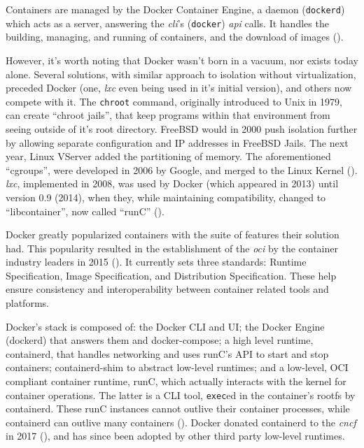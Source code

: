 \documentclass[11pt]{article}
\begin{document}
\begin{flushleft}
    Containers are managed by the Docker Container Engine, a daemon (\texttt{dockerd}) which acts as a server, answering the \textit{\acrshort{cli}}'s (\texttt{docker}) \textit{\acrshort{api}} calls. It handles the building, managing, and running of containers, and the download of images (\cite{dockerengine}).
    \linebreak

    However, it's worth noting that Docker wasn't born in a vacuum, nor exists today alone. Several solutions, with similar approach to isolation without virtualization, preceded Docker (one, \textit{\acrshort{lxc}} even being used in it's initial version), and others now compete with it. The \texttt{chroot} command, originally introduced to Unix in 1979, can create ``chroot jails'', that keep programs within that environment from seeing outside of it's root directory. FreeBSD would in 2000 push isolation further by allowing separate configuration and IP addresses in FreeBSD Jails. The next year, Linux VServer added the partitioning of memory. The aforementioned ``cgroups'', were developed in 2006 by Google, and merged to the Linux Kernel (\cite{historycontainers}). \textit{\acrlong{lxc}}, implemented in 2008, was used by Docker (which appeared in 2013) until version 0.9 (2014), when they, while maintaining compatibility, changed to ``libcontainer'', now called ``runC'' (\cite{docker09}). 
    \linebreak
    
    Docker greatly popularized containers with the suite of features their solution had. This popularity resulted in the establishment of the \textit{\acrlong{oci}} by the container industry leaders in 2015 (\cite{aboutoci}). It currently sets three standards: Runtime Specification, Image Specification, and Distribution Specification. These help ensure consistency and interoperability between container related tools and platforms.
    \linebreak
    
    Docker's stack is composed of: the Docker CLI and UI; the Docker Engine (dockerd) that answers them and docker-compose; a high level runtime, containerd, that handles networking and uses runC's API to start and stop containers; containerd-shim to abstract low-level runtimes; and a low-level, OCI compliant container runtime, runC, which actually interacts with the kernel for container operations. The latter is a CLI tool, \texttt{exec}ed in the container's rootfs by containerd. These runC instances cannot outlive their container processes, while containerd can outlive many containers (\cite{journeyfromcontainerization}). Docker donated containerd to the \textit{\acrlong{cncf}} in 2017 (\cite{cncfdocker}), and has since been adopted by other third party low-level runtimes.
    \linebreak


\end{flushleft}
\end{document}
